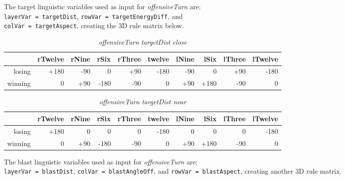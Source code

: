 The target linguistic variables used as input for \emph{offensiveTurn} are: \\ \texttt{layerVar = targetDist}, \texttt{rowVar = targetEnergyDiff}, and \\ \texttt{colVar = targetAspect}, creating the 3D rule matrix below.
\begin{table}[H]
\centering
\caption{\emph{offensiveTurn} \emph{targetDist close}}
\label{Turn rule table}
\begin{tabular}{r|r|r|r|r|r|r|r|r|r}
 		& rTwelve 	& rNine 	& rSix 		& rThree 		& twelve 	& lNine 	& lSix 		& lThree	& lTwelve		\\ \hline
losing	& +180		& -90		& 0			& +90 		 	& -180		& -90		& 0 		& +90		& -180			\\
winning	& 0			& +90		& -180		& -90			& 0			& +90		& +180		& -90		& 0			
\end{tabular}
\end{table}

\begin{table}[H]
\centering
\caption{\emph{offensiveTurn} \emph{targetDist near}}
\label{Turn rule table}
\begin{tabular}{r|r|r|r|r|r|r|r|r|r}
 		& rTwelve 	& rNine 	& rSix 		& rThree 		& twelve 	& lNine 	& lSix 		& lThree	& lTwelve		\\ \hline
losing	& +180		& 0			& 0			& 0 		 	& -180		& 0			& 0 		& 0			& -180			\\
winning	& 0			& +90		& -180		& -90			& 0			& +90		& +180		& -90		& 0			
\end{tabular}
\end{table}

The blast linguistic variables used as input for \emph{offensiveTurn} are: \\ \texttt{layerVar = blastDist}, \texttt{colVar = blastAngleOff}, and \texttt{rowVar = blastAspect}, creating another 3D rule matrix.

